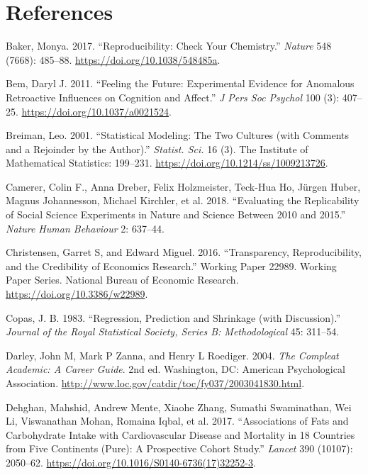 \documentclass[12pt,]{book}
\theoremstyle{definition}
\theoremstyle{definition}
\theoremstyle{definition}
\theoremstyle{remark}
\begin{document}
\hypertarget{references}{%
\chapter{References}\label{references}}

\hypertarget{refs}{}
\leavevmode\hypertarget{ref-bake:2017}{}%
Baker, Monya. 2017. ``Reproducibility: Check Your Chemistry.'' \emph{Nature} 548 (7668): 485--88. \url{https://doi.org/10.1038/548485a}.

\leavevmode\hypertarget{ref-bem:2011}{}%
Bem, Daryl J. 2011. ``Feeling the Future: Experimental Evidence for Anomalous Retroactive Influences on Cognition and Affect.'' \emph{J Pers Soc Psychol} 100 (3): 407--25. \url{https://doi.org/10.1037/a0021524}.

\leavevmode\hypertarget{ref-breiman2001}{}%
Breiman, Leo. 2001. ``Statistical Modeling: The Two Cultures (with Comments and a Rejoinder by the Author).'' \emph{Statist. Sci.} 16 (3). The Institute of Mathematical Statistics: 199--231. \url{https://doi.org/10.1214/ss/1009213726}.

\leavevmode\hypertarget{ref-Camerer2018EvaluatingTR}{}%
Camerer, Colin F., Anna Dreber, Felix Holzmeister, Teck-Hua Ho, Jürgen Huber, Magnus Johannesson, Michael Kirchler, et al. 2018. ``Evaluating the Replicability of Social Science Experiments in Nature and Science Between 2010 and 2015.'' \emph{Nature Human Behaviour} 2: 637--44.

\leavevmode\hypertarget{ref-NBERw22989}{}%
Christensen, Garret S, and Edward Miguel. 2016. ``Transparency, Reproducibility, and the Credibility of Economics Research.'' Working Paper 22989. Working Paper Series. National Bureau of Economic Research. \url{https://doi.org/10.3386/w22989}.

\leavevmode\hypertarget{ref-copa:1983}{}%
Copas, J. B. 1983. ``Regression, Prediction and Shrinkage (with Discussion).'' \emph{Journal of the Royal Statistical Society, Series B: Methodological} 45: 311--54.

\leavevmode\hypertarget{ref-darl:zann:roed:2004}{}%
Darley, John M, Mark P Zanna, and Henry L Roediger. 2004. \emph{The Compleat Academic: A Career Guide}. 2nd ed. Washington, DC: American Psychological Association. \url{http://www.loc.gov/catdir/toc/fy037/2003041830.html}.

\leavevmode\hypertarget{ref-dehg:ment:zhan:2017}{}%
Dehghan, Mahshid, Andrew Mente, Xiaohe Zhang, Sumathi Swaminathan, Wei Li, Viswanathan Mohan, Romaina Iqbal, et al. 2017. ``Associations of Fats and Carbohydrate Intake with Cardiovascular Disease and Mortality in 18 Countries from Five Continents (Pure): A Prospective Cohort Study.'' \emph{Lancet} 390 (10107): 2050--62. \url{https://doi.org/10.1016/S0140-6736(17)32252-3}.
\end{document}
